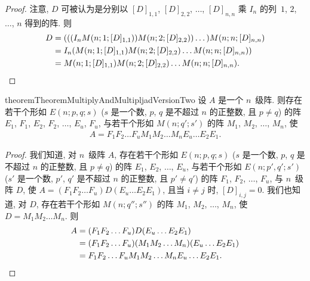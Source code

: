 \documentclass[../libro.tex]{subfiles}
\begin{document}
\begin{proof}
    注意, \(D\) 可被认为是分别以
    \([D]_{1,1}\), \([D]_{2,2}\), \(\dots\), \([D]_{n,n}\)
    乘 \(I_n\) 的列~\(1\), \(2\), \(\dots\), \(n\)
    得到的阵.
    则
    \begin{align*}
        D
        = {} &
        (((I_n M(n; 1; [D]_{1,1})) M(n; 2; [D]_{2,2}))
        \dots) M(n; n; [D]_{n,n})
        \\
        = {} &
        I_n (M(n; 1; [D]_{1,1}) M(n; 2; [D]_{2,2})
        \dots M(n; n; [D]_{n,n}))
        \\
        = {} &
        M(n; 1; [D]_{1,1})
        M(n; 2; [D]_{2,2})
        \dots
        M(n; n; [D]_{n,n}).
        \qedhere
    \end{align*}
\end{proof}

\begin{restatable}{theorem}{TheoremMultiplyAndMultipljadVersionTwo}
    设 \(A\) 是一个 \(n\)~级阵.
    则存在若干个形如 \(E(n; p, q; s)\)
    (\(s\) 是一个数, %
    \(p\), \(q\) 是不超过 \(n\) 的正整数,
    且 \(p \neq q\)) %
    的阵
    \(E_1\), \(F_1\),
    \(E_2\), \(F_2\),
    \(\dots\),
    \(E_u\), \(F_u\),
    与若干个形如 \(M(n; q'; s')\) 的阵
    \(M_1\), \(M_2\), \(\dots\), \(M_n\),
    使
    \begin{align*}
        A =
        F_1 F_2 \dots F_u
        M_1 M_2 \dots M_n
        E_u \dots E_2 E_1.
    \end{align*}
\end{restatable}

\begin{proof}
    我们知道, 对 \(n\)~级阵 \(A\),
    存在若干个形如 \(E(n; p, q; s)\)
    (\(s\) 是一个数, %
    \(p\), \(q\) 是不超过 \(n\) 的正整数,
    且 \(p \neq q\)) %
    的阵
    \(E_1\), \(E_2\), \(\dots\), \(E_u\),
    与若干个形如 \(E(n; p', q'; s')\)
    (\(s'\) 是一个数, %
    \(p'\), \(q'\) 是不超过 \(n\) 的正整数,
    且 \(p' \neq q'\)) %
    的阵
    \(F_1\), \(F_2\), \(\dots\), \(F_u\),
    与 \(n\)~级阵 \(D\),
    使
    \(A = (F_1 F_2 \dots F_u) D (E_u \dots E_2 E_1)\),
    且当 \(i \neq j\) 时, \([D]_{i,j} = 0\).
    我们也知道, 对 \(D\),
    存在若干个形如 \(M(n; q''; s'')\) 的阵
    \(M_1\), \(M_2\), \(\dots\), \(M_n\),
    使 \(D = M_1 M_2 \dots M_n\).
    则
    \begin{align*}
        A
        = {} &
        (F_1 F_2 \dots F_u) D (E_u \dots E_2 E_1)
        \\
        = {} &
        (F_1 F_2 \dots F_u)
        (M_1 M_2 \dots M_n)
        (E_u \dots E_2 E_1)
        \\
        = {} &
        F_1 F_2 \dots F_u
        M_1 M_2 \dots M_n
        E_u \dots E_2 E_1.
        \qedhere
    \end{align*}
\end{proof}
\end{document}
